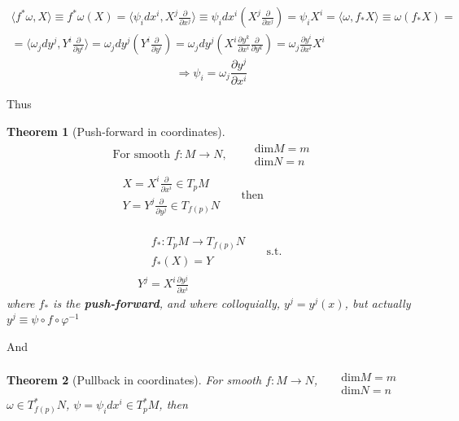 \documentclass[10pt]{amsart}
\newtheorem{theorem}{Theorem}
\begin{document}
\begin{multicols*}{2}
\[
\begin{gathered}
\langle f^* \omega, X \rangle \equiv f^* \omega(X) = \langle \psi_i dx^i, X^j \frac{\partial }{ \partial x^j} \rangle \equiv \psi_i dx^i (X^j \frac{ \partial }{ \partial x^j} ) = \psi_i X^i = \langle \omega , f_* X \rangle  \equiv \omega(f_* X) = \\
= \langle \omega_j dy^j , Y^i \frac{ \partial }{ \partial y^i} \rangle = \omega_j dy^j ( Y^i \frac{\partial }{ \partial y^i} ) = \omega_j dy^j \left( X^i \frac{ \partial y^k}{ \partial x^i } \frac{ \partial }{ \partial y^k } \right) = \omega_j \frac{\partial y^i }{ \partial x^i } X^i 
\end{gathered}
\]
\[
\Longrightarrow \psi_i = \omega_j \frac{\partial y^j}{ \partial x^i}
\]

Thus
\begin{theorem}[Push-forward in coordinates] 
\[
\begin{gathered}
	\text{ For smooth } f: M \to N, \quad \,  \begin{aligned} & \text{dim}M = m \\ & \text{dim} N = n \end{aligned} \\
	\begin{aligned}
		& X = X^i \frac{\partial }{ \partial x^i} \in T_p M \\
		& Y = Y^j \frac{\partial }{ \partial y^j} \in T_{f(p)} N 		
	\end{aligned} \quad \, \text{ then }
\end{gathered} 
\]


\begin{equation}
	\boxed{
		\begin{gathered} 
\begin{aligned}
	& f_* : T_pM \to T_{f(p)} N \\
	& f_* (X) = Y 
\end{aligned} \quad \, \text{ s.t. } \\
Y^j = X^i \frac{\partial y^j}{\partial x^i} 
\end{gathered}
}
\end{equation}
where $f_*$ is the \textbf{push-forward}, and where colloquially, $y^j = y^j(x)$, but actually $y^j \equiv \psi \circ f \circ \varphi^{-1}$
\end{theorem} 

And

\begin{theorem}[Pullback in coordinates]
For smooth $f: M \to N$, \quad \, $ \begin{aligned} & \quad \\ 
	& \text{dim}M = m \\ 
	& \text{dim} N = n \end{aligned}$ \\ 
$\omega \in T^*_{f(p)}N$, $\psi = \psi_i dx^i \in T^*_pM$, then 


\end{theorem}
\end{multicols*}
\end{document}
